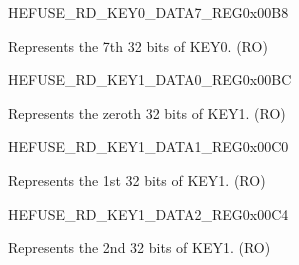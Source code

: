\begin{register}{H}{EFUSE\_RD\_KEY0\_DATA7\_REG}{0x00B8}\label{regdesc:EFUSERDKEY0DATA7REG}
%
\regnewline%
\begin{regdesc}\begin{reglist}
\label{fielddesc:EFUSEKEY0DATA7}\item [EFUSE\_KEY0\_DATA7] Represents the 7th 32 bits of KEY0. (RO)
\end{reglist}\end{regdesc}
\end{register}


\begin{register}{H}{EFUSE\_RD\_KEY1\_DATA0\_REG}{0x00BC}\label{regdesc:EFUSERDKEY1DATA0REG}
%
\regnewline%
\begin{regdesc}\begin{reglist}
\label{fielddesc:EFUSEKEY1DATA0}\item [EFUSE\_KEY1\_DATA0] Represents the zeroth 32 bits of KEY1. (RO)
\end{reglist}\end{regdesc}
\end{register}


\begin{register}{H}{EFUSE\_RD\_KEY1\_DATA1\_REG}{0x00C0}\label{regdesc:EFUSERDKEY1DATA1REG}
%
\regnewline%
\begin{regdesc}\begin{reglist}
\label{fielddesc:EFUSEKEY1DATA1}\item [EFUSE\_KEY1\_DATA1] Represents the 1st 32 bits of KEY1. (RO)
\end{reglist}\end{regdesc}
\end{register}


\begin{register}{H}{EFUSE\_RD\_KEY1\_DATA2\_REG}{0x00C4}\label{regdesc:EFUSERDKEY1DATA2REG}
%
\regnewline%
\begin{regdesc}\begin{reglist}
\label{fielddesc:EFUSEKEY1DATA2}\item [EFUSE\_KEY1\_DATA2] Represents the 2nd 32 bits of KEY1. (RO)
\end{reglist}\end{regdesc}
\end{register}



